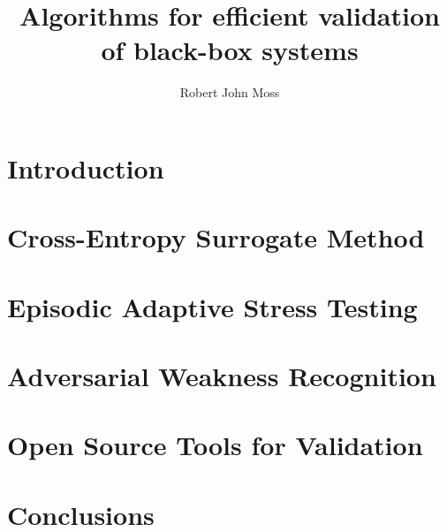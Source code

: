 \documentclass[11pt]{report}
\begin{document}
\title{Algorithms for efficient validation of black-box systems}
\author{Robert John Moss}


\beforepreface
{}

%

\afterpreface

\renewcommand{\chaptermark}[1]{ \markboth{\textsc{#1}}{} }
\renewcommand{\sectionmark}[1]{ \markright{\textsc{#1}}{} }


\chapter{Introduction}\label{cha:introduction}


\chapter{Cross-Entropy Surrogate Method}\label{cha:cem_variants}


\chapter{Episodic Adaptive Stress Testing}\label{cha:episodic_ast}


\chapter{Adversarial Weakness Recognition}\label{cha:weakness_rec}


\chapter{Open Source Tools for Validation}\label{cha:tooling}


\chapter{Conclusions}\label{cha:conclusions}


\appendix


\printbibliography
\end{document}
